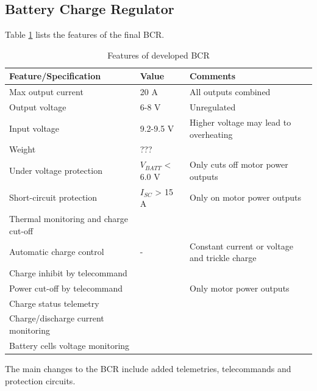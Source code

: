 \subsection{Battery Charge Regulator}
%
Table \ref{tab:BCR_features} lists the features of the final \ac{BCR}.
%
\begin{table}[H]
\centering
\caption{Features of developed \ac{BCR}}
\label{tab:BCR_features}
\begin{tabular}{p{}p{}p{}}
\hline
\textbf{Feature/Specification} & \textbf{Value} & \textbf{Comments}\\
\hline
Max output current & 20 A & All outputs combined \\
Output voltage & 6-8 V & Unregulated \\
Input voltage & 9.2-9.5 V & Higher voltage may lead to overheating\\
Weight & ??? & \\
Under voltage protection & $V_{BATT}$ < 6.0 V & Only cuts off motor power outputs \\
Short-circuit protection & $I_{SC}$ > 15 A & Only on motor power outputs \\
Thermal monitoring and charge cut-off & & \\
Automatic charge control & - & Constant current or voltage and trickle charge\\
Charge inhibit by telecommand & & \\
Power cut-off by telecommand & & Only motor power outputs\\
Charge status telemetry & &\\
Charge/discharge current monitoring & & \\
Battery cells voltage monitoring & & \\
\hline
\end{tabular}
\end{table} 
%
The main changes to the \ac{BCR} include added telemetries, telecommands and protection circuits.
%
%
